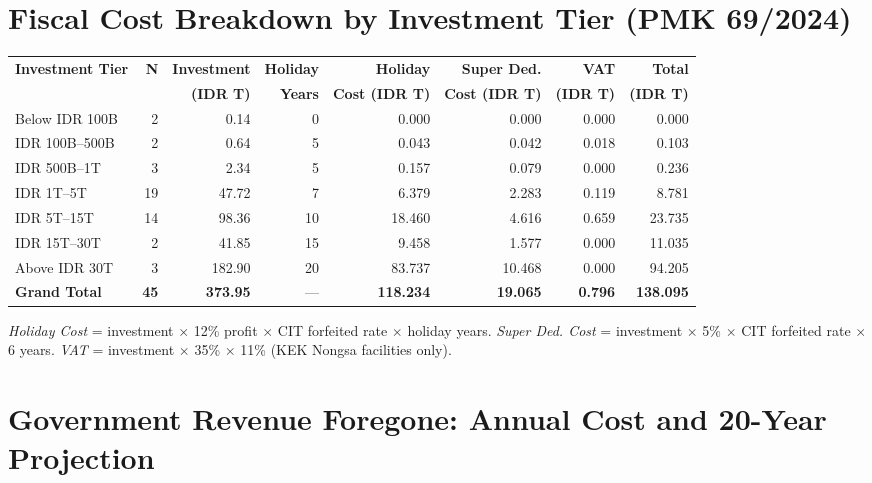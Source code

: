 \documentclass[a4paper,10pt]{article}
\begin{document}
\section{Fiscal Cost Breakdown by Investment Tier (PMK 69/2024)}

\small
\begin{tabular}{lrrrrrrr}
  \toprule
  \textbf{Investment Tier} & \textbf{N} & \textbf{Investment} & \textbf{Holiday} & \textbf{Holiday} & \textbf{Super Ded.} & \textbf{VAT} & \textbf{Total} \\
  & & \textbf{(IDR T)} & \textbf{Years} & \textbf{Cost (IDR T)} & \textbf{Cost (IDR T)} & \textbf{(IDR T)} & \textbf{(IDR T)} \\
  \midrule
  Below IDR 100B          & 2  &   0.14 &  0  &   0.000 &  0.000 & 0.000 &  0.000 \\
  IDR 100B--500B          & 2  &   0.64 &  5  &   0.043 &  0.042 & 0.018 &  0.103 \\
  IDR 500B--1T            & 3  &   2.34 &  5  &   0.157 &  0.079 & 0.000 &  0.236 \\
  IDR 1T--5T              & 19 &  47.72 &  7  &   6.379 &  2.283 & 0.119 &  8.781 \\
  IDR 5T--15T             & 14 &  98.36 & 10  &  18.460 &  4.616 & 0.659 & 23.735 \\
  IDR 15T--30T            & 2  &  41.85 & 15  &   9.458 &  1.577 & 0.000 & 11.035 \\
  Above IDR 30T           & 3  & 182.90 & 20  &  83.737 & 10.468 & 0.000 & 94.205 \\
  \midrule
  \rowcolor{lightgray}
  \textbf{Grand Total}    & \textbf{45} & \textbf{373.95} & --- & \textbf{118.234} & \textbf{19.065} & \textbf{0.796} & \textbf{138.095} \\
  \bottomrule
\end{tabular}

\vspace{8pt}
{\footnotesize\color{midgray}
  \textit{Holiday Cost} = investment $\times$ 12\% profit $\times$ CIT forfeited rate $\times$ holiday years. \quad
  \textit{Super Ded. Cost} = investment $\times$ 5\% $\times$ CIT forfeited rate $\times$ 6 years. \quad
  \textit{VAT} = investment $\times$ 35\% $\times$ 11\% (KEK Nongsa facilities only).
}

\vspace{8pt}

\section{Government Revenue Foregone: Annual Cost and 20-Year Projection}
\end{document}
